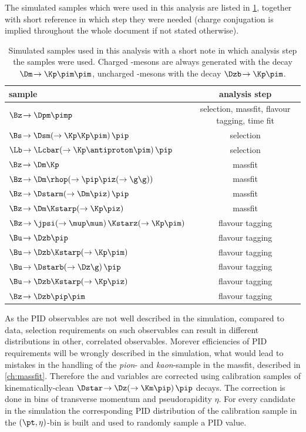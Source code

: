 The simulated samples which were used in this analysis are listed in \cref{tab:simSamples}, together with short reference in which step they were needed (charge conjugation is implied throughout the whole document if not stated otherwise).
\begin{table}[tbp]
	\centering
	\caption{Simulated samples used in this analysis with a short note in which analysis step the samples were used. Charged \D-mesons are always generated with the decay $\Dm\!\to\Kp\pim\pim$, uncharged \D-mesons with the decay $\Dzb\!\to\Kp\pim$.}
	\begin{tabular}{lc}
		\toprule
		sample & analysis step \\
		\midrule
		$\Bz\!\to\Dpm\pimp$ 														& selection, massfit, flavour tagging, time fit \\
		$\Bs\!\to\Dsm\!\left(\to\Kp\Kp\pim\right)\pip$  							& selection \\
		$\Lb\!\to\Lcbar\!\left(\to\Kp\antiproton\pim\right)\pip$ 					& selection \\
		$\Bz\!\to\Dm\Kp$ 															& massfit \\
		$\Bz\!\to\Dm\rhop\!\left(\to\pip\piz\!\left(\to\g\g\right)\right)$ 			& massfit \\
		$\Bz\!\to\Dstarm\!\left(\to\Dm\piz\right)\pip$ 								& massfit \\
		$\Bz\!\to\Dm\Kstarp\!\left(\to\Kp\piz\right)$ 								& massfit \\
		$\Bz\!\to\jpsi\!\left(\to\mup\mun\right)\Kstarz\!\left(\to\Kp\pim\right)$ 	& flavour tagging \\
		$\Bu\!\to\Dzb\pip$ 															& flavour tagging \\
		$\Bu\!\to\Dzb\Kstarp\!\left(\to\Kp\pim\right)$ 								& flavour tagging \\
		$\Bu\!\to\Dstarb\!\left(\to\Dz\g\right)\pip$ 								& flavour tagging \\
		$\Bu\!\to\Dzb\Kstarp\!\left(\to\Kp\piz\right)$ 								& flavour tagging \\
		$\Bz\!\to\Dzb\pip\pim$ 														& flavour tagging \\
		\bottomrule
	\end{tabular}
	\label{tab:simSamples}
\end{table}
As the PID observables are not well described in the simulation, compared to data, selection requirements on such observables can result in different distributions in other, correlated observables.
Morever efficiencies of PID requirements will be wrongly described in the simulation, what would lead to mistakes in the handling of the \emph{pion}- and \emph{kaon}-sample in the massfit, described in \cref{ch:massfit}.
Therefore the \dllkpi and \dllppi variables are corrected using calibration samples of kinematically-clean $\Dstar\!\to\Dz\!\left(\to\Km\pip\right)\pip$ decays.
The correction is done in bins of transverse momentum \pt and pseudorapidity $\eta$.
For every candidate in the simulation the corresponding PID distribution of the calibration sample in the $(\pt,\eta)$-bin is built and used to randomly sample a PID value.

